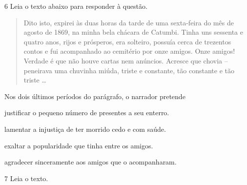 \num{6} Leia o texto abaixo para responder à questão. 


\begin{quote}

Dito isto, expirei às duas horas da tarde de uma
sexta-feira do mês de agosto de 1869, na minha bela
chácara de Catumbi. Tinha uns sessenta e quatro anos,
rijos e prósperos, era solteiro, possuía cerca de trezentos
contos e fui acompanhado ao cemitério por onze amigos.
Onze amigos! Verdade é que não houve cartas nem
anúncios. Acresce que chovia -- peneirava uma chuvinha
miúda, triste e constante, tão constante e tão triste \ldots{}

\end{quote}


Nos dois últimos períodos do parágrafo, o narrador pretende 

\begin{escolha}

    \item justificar o pequeno número de presentes a seu enterro. 

    \item lamentar a injustiça de ter morrido cedo e com saúde.

    \item exaltar a popularidade que tinha entre os amigos.

    \item agradecer sinceramente aos amigos que o acompanharam.

\end{escolha}

\num{7} Leia o texto. 


